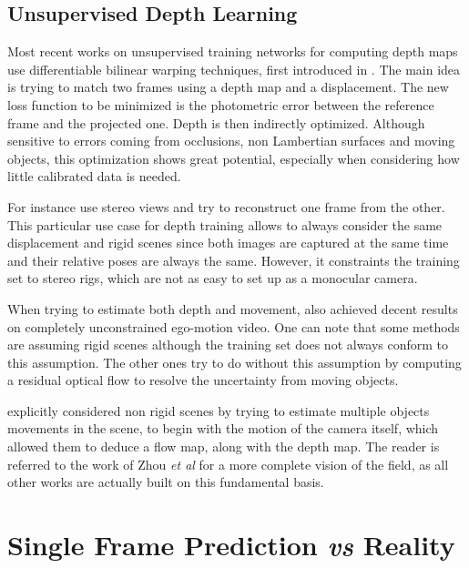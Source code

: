 \documentclass[runningheads]{llncs}
\def\etal{\emph{et al}\:}
\begin{document}
\subsection{Unsupervised Depth Learning}
Most recent works on unsupervised training networks for computing depth maps use differentiable bilinear warping techniques, first introduced in \cite{jaderberg2015spatial}. The main idea is trying to match two frames using a depth map and a displacement. The new loss function to be minimized is the photometric error between the reference frame and the projected one. Depth is then indirectly optimized. Although sensitive to errors coming from occlusions, non Lambertian surfaces and moving objects, this optimization shows great potential, especially when considering how little calibrated data is needed.

For instance \cite{monodepth17, garg2016unsupervised, xie2016deep3d} use stereo views and try to reconstruct one frame from the other. This particular use case for depth training allows to always consider the same displacement and rigid scenes since both images are captured at the same time and their relative poses are always the same. However, it constraints the training set to stereo rigs, which are not as easy to set up as a monocular camera.

When trying to estimate both depth and movement, \cite{zhou2017unsupervised, yin2018geonet, Mahjourian, DBLP:journals/corr/abs-1805-09806} also achieved decent results on completely unconstrained ego-motion video. One can note that some methods \cite{zhou2017unsupervised} are assuming rigid scenes although the training set does not always conform to this assumption. The other ones try to
do without this assumption by computing
a residual optical flow
to resolve
the uncertainty from moving objects.

\cite{Vijayanarasimhan17} explicitly considered non rigid scenes by trying to estimate multiple objects movements in the scene, to begin with the motion of the camera itself, which allowed them to deduce a flow map, along with the depth map. The reader is
referred to
the work of Zhou \etal \cite{zhou2017unsupervised} for a more complete vision of the field, as all other works
are actually built
on this fundamental basis.

\section{Single Frame Prediction
{\em vs}
Reality}
\end{document}
